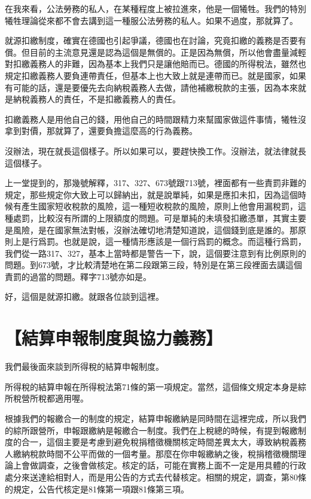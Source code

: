 \documentclass[oneside,sub3section]{ctexbook}
\begin{document}
在我來看，公法勞務的私人，在某種程度上被拉進來，他是一個犧牲。我們的特別犧牲理論從來都不會去講到這一種服公法勞務的私人。如果不過度，那就算了。

就源扣繳制度，確實在德國也引起爭議，德國也在討論，究竟扣繳的義務是否要有償。但目前的主流意見還是認為這個是無償的。正是因為無償，所以他會盡量減輕對扣繳義務人的非難，因為基本上我們只是讓他賠而已。德國的所得稅法，雖然也規定扣繳義務人要負連帶責任，但基本上也大致上就是連帶而已。就是國家，如果有可能的話，還是要優先去向納稅義務人去做，請他補繳稅款的主張，因為本來就是納稅義務人的責任，不是扣繳義務人的責任。

扣繳義務人是用他自己的錢，用他自己的時間跟精力來幫國家做這件事情，犧牲沒拿到對價，那就算了，還要負擔這麼高的行為義務。

沒辦法，現在就長這個樣子。所以如果可以，要趕快換工作。沒辦法，就法律就長這個樣子。

上一堂提到的，那幾號解釋，317、327、673號跟713號，裡面都有一些責罰非難的規定，那些規定你大致上可以歸納出，就是說單純，如果是應扣未扣，因為這個時候有產生國家短收稅款的風險，這一種短收稅款的風險，原則上他會用漏稅罰，這種處罰，比較沒有所謂的上限額度的問題。可是單純的未填發扣繳憑單，其實主要是風險，是在國家無法對帳，沒辦法確切地清楚知道說，這個錢到底是誰的。那原則上是行爲罰。也就是說，這一種情形應該是一個行爲罰的概念。而這種行爲罰，我們從一路317、327，基本上當時都是警告一下，說，這個要注意到有比例原則的問題。到673號，才比較清楚地在第二段跟第三段，特別是在第三段裡面去講這個責罰的過當的問題。釋字713號亦如是。

好，這個是就源扣繳。就跟各位談到這裡。

\hypertarget{ux7d50ux7b97ux7533ux5831ux5236ux5ea6ux8207ux5354ux529bux7fa9ux52d9}{%
\section{【結算申報制度與協力義務】}\label{ux7d50ux7b97ux7533ux5831ux5236ux5ea6ux8207ux5354ux529bux7fa9ux52d9}}

我們最後面來談到所得稅的結算申報制度。

所得稅的結算申報在所得稅法第71條的第一項規定。當然，這個條文規定本身是綜所稅營所稅都適用喔。

根據我們的報繳合一的制度的規定，結算申報繳納是同時間在這裡完成，所以我們的綜所跟營所，申報跟繳納是報繳合一制度。我們在上稅總的時候，有提到報繳制度的合一，這個主要是考慮到避免稅捐稽徵機關核定時間差異太大，導致納稅義務人繳納稅款時間不公平而做的一個考量。那麼在你申報繳納之後，稅捐稽徵機關理論上會做調查，之後會做核定。核定的話，可能在實務上面不一定是用具體的行政處分來送達給相對人，而是用公告的方式去代替核定。相關的規定，調查，第80條的規定，公告代核定是81條第一項跟81條第三項。
\end{document}
